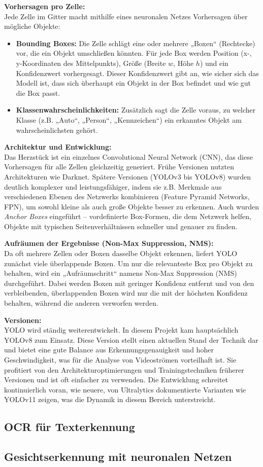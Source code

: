 \textbf{Vorhersagen pro Zelle:} \\
Jede Zelle im Gitter macht mithilfe eines neuronalen Netzes Vorhersagen über mögliche Objekte:
\begin{itemize}
    \item \textbf{Bounding Boxes:} Die Zelle schlägt eine oder mehrere „Boxen“ (Rechtecke) vor, die ein Objekt umschließen könnten. Für jede Box werden Position (x-, y-Koordinaten des Mittelpunkts), Größe (Breite $w$, Höhe $h$) und ein Konfidenzwert vorhergesagt. Dieser Konfidenzwert gibt an, wie sicher sich das Modell ist, dass sich überhaupt ein Objekt in der Box befindet und wie gut die Box passt.
    \item \textbf{Klassenwahrscheinlichkeiten:} Zusätzlich sagt die Zelle voraus, zu welcher Klasse (z.B. „Auto“, „Person“, „Kennzeichen“) ein erkanntes Objekt am wahrscheinlichsten gehört.
\end{itemize}

\textbf{Architektur und Entwicklung:} \\
Das Herzstück ist ein einzelnes Convolutional Neural Network (CNN), das diese Vorhersagen für alle Zellen gleichzeitig generiert. Frühe Versionen nutzten Architekturen wie Darknet. Spätere Versionen (YOLOv3 bis YOLOv8) wurden deutlich komplexer und leistungsfähiger, indem sie z.B. Merkmale aus verschiedenen Ebenen des Netzwerks kombinieren (Feature Pyramid Networks, FPN), um sowohl kleine als auch große Objekte besser zu erkennen. Auch wurden \textit{Anchor Boxes} eingeführt – vordefinierte Box-Formen, die dem Netzwerk helfen, Objekte mit typischen Seitenverhältnissen schneller und genauer zu finden.

\textbf{Aufräumen der Ergebnisse (Non-Max Suppression, NMS):} \\
Da oft mehrere Zellen oder Boxen dasselbe Objekt erkennen, liefert YOLO zunächst viele überlappende Boxen. Um nur die relevanteste Box pro Objekt zu behalten, wird ein „Aufräumschritt“ namens Non-Max Suppression (NMS) durchgeführt. Dabei werden Boxen mit geringer Konfidenz entfernt und von den verbleibenden, überlappenden Boxen wird nur die mit der höchsten Konfidenz behalten, während die anderen verworfen werden.

\textbf{Versionen:} \\
YOLO wird ständig weiterentwickelt. In diesem Projekt kam hauptsächlich YOLOv8 zum Einsatz. Diese Version stellt einen aktuellen Stand der Technik dar und bietet eine gute Balance aus Erkennungsgenauigkeit und hoher Geschwindigkeit, was für die Analyse von Videoströmen vorteilhaft ist. Sie profitiert von den Architekturoptimierungen und Trainingstechniken früherer Versionen und ist oft einfacher zu verwenden. Die Entwicklung schreitet kontinuierlich voran, wie neuere, von Ultralytics dokumentierte Varianten wie YOLOv11 zeigen, was die Dynamik in diesem Bereich unterstreicht.

\subsection{OCR für Texterkennung}

\subsection{Gesichtserkennung mit neuronalen Netzen}